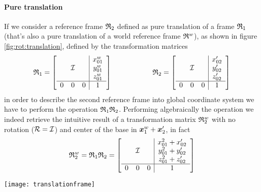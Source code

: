 		\paragraph{Pure translation} If we consider a reference frame $\mathfrak {R}_{2}$ defined as pure translation of a frame $\mathfrak {R}_{1}$ (that's also a pure translation of a world reference frame $\mathfrak{R}^w$), as shown in figure \ref{fig:rot:translation}, defined by the transformation matrices 
		\[ \mathfrak {R}_{1} = \begin{bmatrix}  \begin{array}{c c c | c}  &&& x_{01}^w \\ & \mathcal I&& y_{01}^w \\ &&& z_{01}^w \\ \hline 0 & 0 & 0 & 1  \end{array} \end{bmatrix} \hspace{2cm} \mathfrak {R}_{2} = \begin{bmatrix}  \begin{array}{c c c | c}  &&& x_{02}' \\ & \mathcal I&& y_{02}' \\ &&& z_{02}' \\ \hline 0 & 0 & 0 & 1  \end{array} \end{bmatrix} \]
		in order to describe the second reference frame into global coordinate system we have to perform the operation $\mathfrak {R}_{1} \mathfrak {R}_{2}$. Performing algebraically the operation we indeed retrieve the intuitive result of a transformation matrix $\mathfrak {R}_{2}^w$ with no rotation ($\mathcal R = \mathcal I$) and center of the base in  $\boldsymbol{x}_1^w + \boldsymbol{x}_2'$, in fact
		\[ \mathfrak {R}_{2}^w = \mathfrak {R}_{1}\mathfrak {R}_{2} = \begin{bmatrix}  \begin{array}{c c c | c}  &&& x_{01}^2 + x_{02}' \\ & \mathcal I&& y_{01}^2 + y_{02}' \\ &&& z_{01}^2 + z_{02}' \\ \hline 0 & 0 & 0 & 1  \end{array} \end{bmatrix} \]
		
		\begin{SCfigure}[2][bht]
			\centering \texttt{[image: translationframe]}
			\caption{multiple transformations of pure translation; in this case, for sake of simplicity, the planar case has been considered.} \label{fig:rot:translation}
		\end{SCfigure}
		
